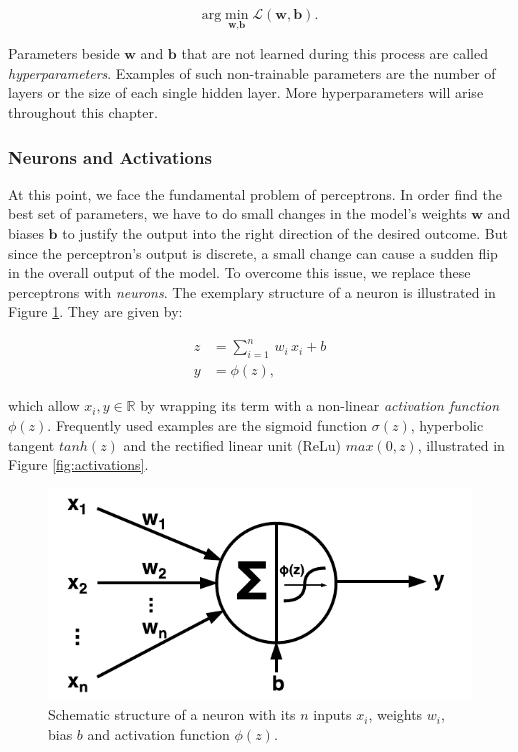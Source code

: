 \begin{equation} \label{eq:min-loss}
  \textrm{arg}\min_{\textbf{w}, \textbf{b}} \mathcal{L}(\textbf{w}, \textbf{b}) .
\end{equation}

Parameters beside $ \textbf{w} $ and $ \textbf{b} $ that are not learned during this process are called \textit{hyperparameters}. Examples of such non-trainable parameters are the number of layers or the size of each single hidden layer. More hyperparameters will arise throughout this chapter.


\subsubsection{Neurons and Activations}

At this point, we face the fundamental problem of perceptrons. In order find the best set of parameters, we have to do small changes in the model's weights $ \textbf{w} $ and biases $ \textbf{b} $ to justify the output into the right direction of the desired outcome. But since the perceptron's output is discrete, a small change can cause a sudden flip in the overall output of the model. To overcome this issue, we replace these perceptrons with \textit{neurons}. The exemplary structure of a neuron is illustrated in Figure \ref{fig:neuron}. They are given by:

\begin{equation}
\begin{aligned}
z &= \sum\limits_{i=1}^n \, w_{i} \, x_{i} + b \\
y &= \phi(z) ,
\end{aligned}
\end{equation}

which allow $ x_{i}, y \in \mathbb{R} $ by wrapping its term with a non-linear \textit{activation function} $ \phi(z) $. Frequently used examples are the sigmoid function $ \sigma(z) $, hyperbolic tangent $ tanh(z) $ and the rectified linear unit (ReLu) $ max(0, z) $, illustrated in Figure \ref{fig:activations}.

\begin{figure}[htpb]
	\centering
	\includegraphics[width=.45\linewidth]{figures/neuron.pdf}
	\caption[Schematic Neuron]{Schematic structure of a neuron with its $ n $ inputs $x_{i}$, weights $w_{i}$, bias $ b $ and activation function $\phi(z)$.} \label{fig:neuron}
\end{figure}

